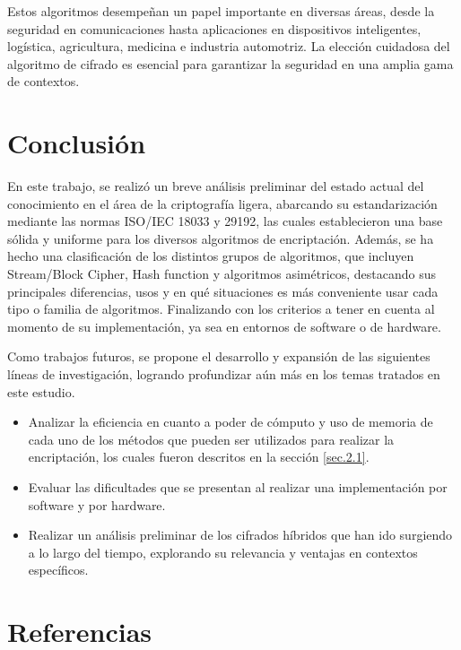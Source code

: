 \documentclass[a4paper,10pt]{article}
\begin{document}
	Estos algoritmos desempeñan un papel importante en diversas áreas, desde la seguridad en comunicaciones hasta aplicaciones en dispositivos inteligentes, logística, agricultura, medicina e industria automotriz. La elección cuidadosa del algoritmo de cifrado es esencial para garantizar la seguridad en una amplia gama de contextos.
	
	\section{Conclusión}
	En este trabajo, se realizó un breve análisis preliminar del estado actual del conocimiento en el área de la criptografía ligera, abarcando su estandarización mediante las normas ISO/IEC 18033 y 29192, las cuales establecieron una base sólida y uniforme para los diversos algoritmos de encriptación. Además, se ha hecho una clasificación de los distintos grupos de algoritmos, que incluyen Stream/Block Cipher, Hash function y algoritmos asimétricos, destacando sus principales diferencias, usos y en qué situaciones es más conveniente usar cada tipo o familia de algoritmos. Finalizando con los criterios a tener en cuenta al momento de su implementación, ya sea en entornos de software o de hardware.
	
	Como trabajos futuros, se propone el desarrollo y expansión de las siguientes líneas de investigación, logrando profundizar aún más en los temas tratados en este estudio.

	\begin{itemize}
	\item Analizar la eficiencia en cuanto a poder de cómputo y uso de memoria de cada uno de los métodos que pueden ser utilizados para realizar la encriptación, los cuales fueron descritos en la sección \ref{sec.2.1}.
	\item Evaluar las dificultades que se presentan al realizar una implementación por software y por hardware.
	\item Realizar un análisis preliminar de los cifrados híbridos que han ido surgiendo a lo largo del tiempo, explorando su relevancia y ventajas en contextos específicos.
	\end{itemize}
	
	\section{Referencias}
	\nocite{*}
	\printbibliography[heading=none]
\end{document}
